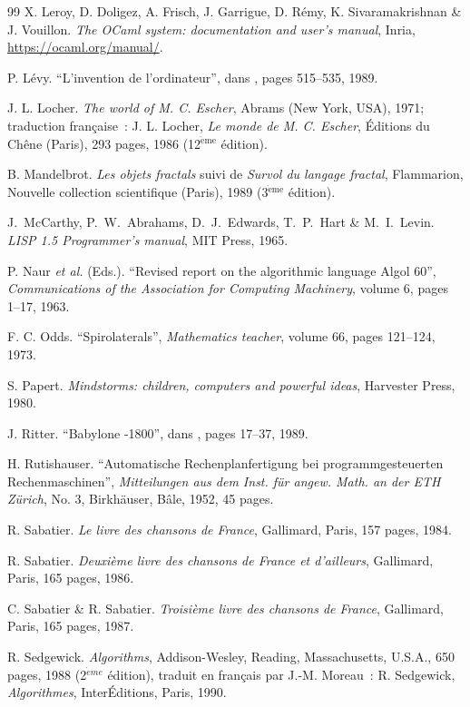\begin{thebibliography}{99}
 X. Leroy, D. Doligez, A. Frisch, J. Garrigue, D. Rémy, K. Sivaramakrishnan
\& J. Vouillon. {\em The OCaml system: documentation and user's manual}, Inria, 
\url{https://ocaml.org/manual/}.

 P. Lévy.
``L'invention de l'ordinateur'', \rm dans \cite{serres1}, pages 515--535, 1989.

 J. L. Locher.
{\em The world of M. C. Escher}, Abrams (New York, USA), 1971\/\/;
{\footnotesize traduction française~:} J. L. Locher,
{\em Le monde de M. C. Escher}, Éditions du Chêne (Paris), 
293 pages, 1986 (12$^{\mathrm{\grave{e}me}}$ édition).

 B. Mandelbrot.
{\em Les objets fractals} {\footnotesize suivi de} {\em Survol du langage
fractal}, Flammarion, Nouvelle collection scientifique (Paris), 1989
(3$^{\mathrm{\grave{e}me}}$ édition).

 J.~McCarthy, P.~W.~Abrahams, D.~J.~Edwards, T.~P.~Hart
\& M.~I.~Levin.
{\em LISP 1.5 Programmer's manual}, 
MIT Press, 1965.

 P. Naur {\em et al.}  (Eds.).
``Revised report on the algorithmic language Algol 60'', 
{\em Communications of the Association for Computing Machinery}, 
volume 6, pages 1--17, 1963.

 F. C. Odds.
``Spirolaterals'', {\em Mathematics teacher}, volume 66, pages 121--124, 1973.

 S. Papert.
{\em Mindstorms: children, computers and powerful ideas}, Harvester Press, 
1980.

 J. Ritter.
``Babylone -1800'', \rm dans \cite{serres1}, pages 17--37, 1989.

 H. Rutishauser.
``Automatische Rechenplanfertigung bei programmgesteuerten
Rechenmaschinen'', {\em Mitteilungen aus dem Inst. für angew. Math. an der ETH 
Zürich}, No. 3, Birkhäuser, Bâle, 1952, 45 pages.

 R. Sabatier.
{\em Le livre des chansons de France}, Gallimard, Paris, 157 pages, 1984.

 R. Sabatier.
{\em Deuxième livre des chansons de France et d'ailleurs}, 
Gallimard, Paris, 165 pages, 1986.

 C. Sabatier \& R. Sabatier.
{\em Troisième livre des chansons de France}, 
Gallimard, Paris, 165 pages, 1987.

 R. Sedgewick.
{\em Algorithms}, Addison-Wesley, Reading, Massachusetts, U.S.A., 
650 pages, 1988 (2$^{\grave{e}me}$ édition), {\footnotesize traduit en français par
J.-M. Moreau~:} R. Sedgewick, {\em Algorithmes}, InterÉditions, Paris, 1990.


\end{thebibliography}
